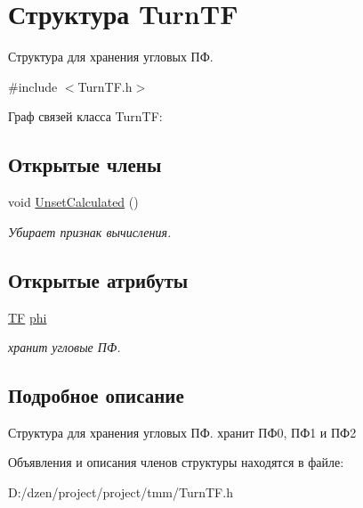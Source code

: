 \hypertarget{struct_turn_t_f}{
\section{Структура TurnTF}
\label{struct_turn_t_f}
}


Структура для хранения угловых ПФ.  




{\ttfamily \#include $<$TurnTF.h$>$}



Граф связей класса TurnTF:
\subsection*{Открытые члены}
\begin{DoxyCompactItemize}
\item 
\hypertarget{struct_turn_t_f_a919d3d3e6199f15148ac781054d7d0b1}{
void \hyperlink{struct_turn_t_f_a919d3d3e6199f15148ac781054d7d0b1}{UnsetCalculated} ()}
\label{struct_turn_t_f_a919d3d3e6199f15148ac781054d7d0b1}

\begin{DoxyCompactList}\small\item\em Убирает признак вычисления. \item\end{DoxyCompactList}\end{DoxyCompactItemize}
\subsection*{Открытые атрибуты}
\begin{DoxyCompactItemize}
\item 
\hypertarget{struct_turn_t_f_a93ced4fb4eb233b569276e47ec67db93}{
\hyperlink{struct_t_f}{TF} \hyperlink{struct_turn_t_f_a93ced4fb4eb233b569276e47ec67db93}{phi}}
\label{struct_turn_t_f_a93ced4fb4eb233b569276e47ec67db93}

\begin{DoxyCompactList}\small\item\em хранит угловые ПФ. \item\end{DoxyCompactList}\end{DoxyCompactItemize}


\subsection{Подробное описание}
Структура для хранения угловых ПФ. хранит ПФ0, ПФ1 и ПФ2 

Объявления и описания членов структуры находятся в файле:\begin{DoxyCompactItemize}
\item 
D:/dzen/project/project/tmm/TurnTF.h\end{DoxyCompactItemize}
